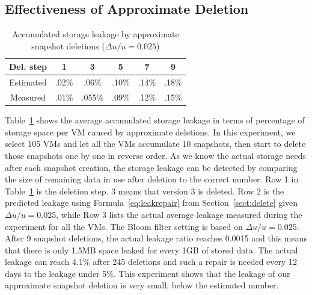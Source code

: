  \subsection{Effectiveness of Approximate Deletion}

\begin{table}
\centering
\begin{small}
    \begin{tabular}{|c|c|c|c|c|c|}
    \hline
Del. step   &     1 &  3  & 5 & 7  & 9 \\ 
\hline   
     Estimated& .02\% & .06\% & .10\%& .14\% & .18\%\\ 
\hline   
     Measured & .01\% & .055\% & .09\% & .12\% & .15\% \\
\hline   
    \end{tabular}
\end{small}
     \caption{Accumulated storage leakage by approximate snapshot deletions ($\Delta u/u=0.025$)}
     \label{tab:leakage}
\end{table}

Table~\ref{tab:leakage} shows the average accumulated storage leakage in terms of percentage of
storage space per VM caused  by approximate deletions.
In this experiment, we select 105 VMs and let all the VMs accumulate 10 snapshots, 
then start to delete those snapshots one by one in reverse order.
As we know the actual storage needs after each snapshot creation,
the storage leakage can be detected by
comparing the size of remaining data in use after deletion to the correct number.
Row 1 in  Table~\ref{tab:leakage} 
is the deletion step. 3 means that version 3 is deleted. 
Row  2 is the predicted leakage using Formula~\ref{eq:leakrepair} from Section~\ref{sect:delete}
given $\Delta u/u=0.025$,
while Row 3 lists the actual average leakage measured during the experiment for all the VMs. 
The Bloom filter setting is based on $\Delta u/u=0.025$.
After 9 snapshot deletions, the actual leakage ratio reaches 0.0015 and this means that
there is only 1.5MB space leaked for every 1GB of stored data.
The actual leakage can reach  4.1\% after  245 deletions and such a repair is needed every 12 days
to the  leakage under 5\%. 
This experiment shows that the leakage of our approximate snapshot deletion is very small, 
below the estimated number.

